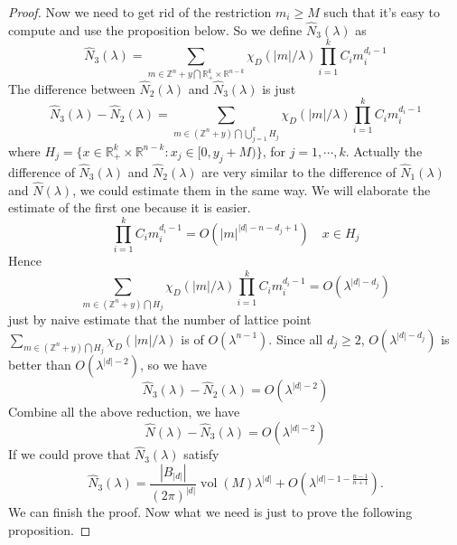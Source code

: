 \documentclass[10pt]{amsart}
\newcommand{\R}{{\mathbb R}}
\newcommand{\1}{\mathbb{1}}
\newcommand{\vol}{\operatorname{vol}}
\newcommand{\Z}{{\mathbb Z}}
\begin{document}
\begin{proof}
    Now we need to get rid of the restriction $m_i \geq M$ such that it's easy to compute and use the proposition below. So we define $\hat{N}_3(\lambda)$ as
    \[
    \hat{N}_3(\lambda) = \sum_{m \in  \Z^{n} + y \bigcap \R_{+}^k \times \R^{n-k}} \chi_D(|m|/\lambda) \prod_{i=1}^k C_im_i^{d_i-1}
    \]
    The difference between $\hat{N}_2(\lambda)$ and $\hat{N}_3(\lambda)$ is just
    \[
    \hat{N}_3(\lambda) - \hat{N}_2(\lambda) = \sum_{m \in  (\Z^{n} + y) \bigcap \bigcup_{j=1}^k H_j} \chi_D(|m|/\lambda) \prod_{i=1}^k C_im_i^{d_i-1}
    \]
    where $H_j = \{ x \in \R_{+}^k \times \R^{n-k} : x_j \in [0,y_j+M)\}$, for $j = 1, \cdots, k$. Actually the difference of $\hat{N}_3(\lambda) $ and $\hat{N}_2(\lambda) $ are very similar to the difference of $\hat{N}_1(\lambda) $ and $\hat{N}(\lambda) $, we could estimate them in the same way. We will elaborate the estimate of the first one because it is easier.
    \[
    \prod_{i=1}^k C_i m_i^{d_i-1} = O(|m|^{|d|-n-d_j+1}) \quad x \in H_j
    \]
    Hence 
    \[
    \sum_{m \in  (\Z^{n} + y) \bigcap H_j} \chi_D(|m|/\lambda) \prod_{i=1}^k C_im_i^{d_i-1} = O(\lambda^{|d|-d_j})
    \]
    just by naive estimate that the number of lattice point $\sum_{m \in  (\Z^{n} + y) \bigcap H_j} \chi_D(|m|/\lambda)$ is of $O(\lambda^{n-1})$. Since all $d_j \geq 2$, $O(\lambda^{|d|-d_j})$ is better than $O(\lambda^{|d|-2})$, so we have 
    \begin{equation}
        \hat{N}_3(\lambda) - \hat{N}_2(\lambda) = O(\lambda^{|d|-2})
    \end{equation}
    Combine all the above reduction, we have 
    \begin{equation}
        \hat{N}(\lambda) - \hat{N}_3(\lambda) = O(\lambda^{|d|-2})
    \end{equation}
    If we could prove that $\hat{N}_3(\lambda)$ satisfy
    \begin{equation}
        \hat{N}_3(\lambda) = \frac{|B_{|d|}|}{(2\pi)^{|d|}} \vol(M) \lambda^{|d|} + O(\lambda^{|d|-1-\frac{n-1}{n+1}}).
    \end{equation}
    We can finish the proof. Now what we need is just to prove the following proposition.
\end{proof}
\end{document}
